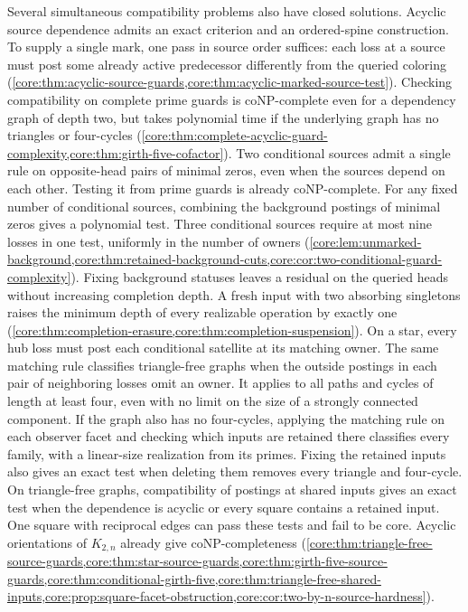 Several simultaneous compatibility problems also have closed solutions.
Acyclic source dependence admits an exact criterion and an ordered-spine
construction. To supply a single mark, one pass in source order suffices:
each loss at a source must post some already active predecessor
differently from the queried coloring
(\cref{core:thm:acyclic-source-guards,core:thm:acyclic-marked-source-test}). Checking compatibility on complete prime guards is coNP-complete even for a
dependency graph of depth two, but takes polynomial time if the underlying
graph has no triangles or four-cycles
(\cref{core:thm:complete-acyclic-guard-complexity,core:thm:girth-five-cofactor}).
Two conditional sources admit a single rule on opposite-head pairs
of minimal zeros, even when the sources depend on each other.
Testing it from prime guards is already coNP-complete. For any fixed
number of conditional sources, combining the background postings of
minimal zeros gives a polynomial test. Three conditional sources
require at most nine losses in one test, uniformly in the number of
owners (\cref{core:lem:unmarked-background,core:thm:retained-background-cuts,core:cor:two-conditional-guard-complexity}).
Fixing background statuses leaves a residual on the queried heads
without increasing completion depth. A fresh input with two absorbing
singletons raises the minimum depth of every realizable operation by
exactly one (\cref{core:thm:completion-erasure,core:thm:completion-suspension}).
On a star, every hub loss must post each conditional satellite at its
matching owner. The same matching rule classifies triangle-free graphs
when the outside postings in each pair of neighboring losses omit an
owner. It applies to all paths and cycles of length at least four,
even with no limit on the size of a strongly connected component.
If the graph also has no four-cycles, applying the matching rule on
each observer facet and checking which inputs are retained there
classifies every family, with a linear-size realization from its primes.
Fixing the retained inputs also gives an exact test when deleting them
removes every triangle and four-cycle. On triangle-free graphs,
compatibility of postings at shared inputs gives an
exact test when the dependence is acyclic or every square contains a
retained input. One square with reciprocal edges
can pass these tests and fail to be core. Acyclic orientations of
$K_{2,n}$ already give coNP-completeness
(\cref{core:thm:triangle-free-source-guards,core:thm:star-source-guards,core:thm:girth-five-source-guards,core:thm:conditional-girth-five,core:thm:triangle-free-shared-inputs,core:prop:square-facet-obstruction,core:cor:two-by-n-source-hardness}).
